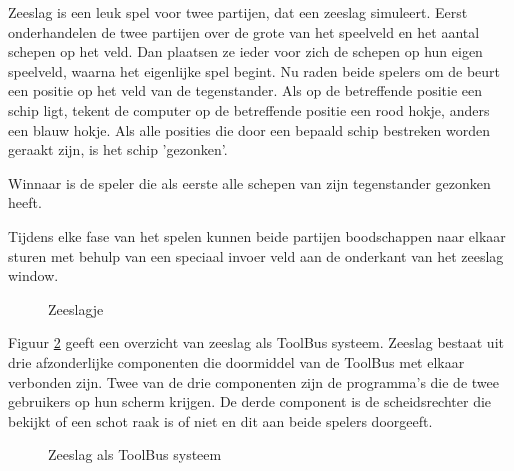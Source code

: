 \documentclass[a4]{article}
\begin{document}
Zeeslag is een leuk spel voor twee partijen, dat een zeeslag simuleert.
Eerst onderhandelen de twee partijen over de grote van het speelveld en
het aantal schepen op het veld. Dan plaatsen ze ieder voor zich de
schepen op hun eigen speelveld, waarna het eigenlijke spel begint. Nu raden
beide spelers om de beurt een positie op het veld van de tegenstander.
Als op de betreffende positie een schip ligt, tekent de computer op 
de betreffende positie een rood hokje, anders een blauw hokje.
Als alle posities die door een bepaald schip bestreken worden geraakt
zijn, is het schip 'gezonken'.

Winnaar is de speler die als eerste alle schepen van zijn tegenstander
gezonken heeft.

Tijdens elke fase van het spelen kunnen beide partijen boodschappen
naar elkaar sturen met behulp van een speciaal invoer veld aan de onderkant
van het zeeslag window.

\begin{figure}[htb]
\centerline{}
\caption{Zeeslagje}
\label{battleships}
\end{figure}

Figuur \ref{zeeslag} geeft een overzicht van zeeslag als ToolBus systeem.
Zeeslag bestaat uit drie afzonderlijke componenten die doormiddel van de
ToolBus met elkaar verbonden zijn. Twee van de drie componenten zijn de
programma's die de twee gebruikers op hun scherm krijgen. De derde
component is de scheidsrechter die bekijkt of een schot raak is of niet
en dit aan beide spelers doorgeeft.

\begin{figure}[htb]
\centerline{}
\caption{Zeeslag als ToolBus systeem}
\label{zeeslag}
\end{figure}
\end{document}
